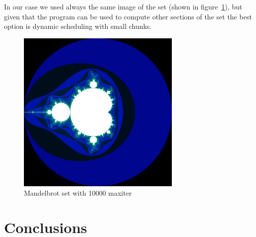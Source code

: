 In our case we used always the same image of the set (shown in figure~\ref{fig:set}), but given that the program can be
used to compute other sections of the set the best option is dynamic scheduling with small chunks.

\begin{figure}[H]
    \centering
    \includegraphics[width=0.7\textwidth]{images/set.png}
    \caption{Mandelbrot set with 10000 maxiter}
    \label{fig:set} 
\end{figure}

\section{Conclusions}%
\label{sec:Conclusions}




